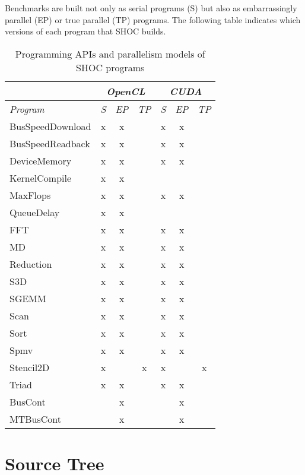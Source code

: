 \documentclass[11pt]{article}
\begin{document}
Benchmarks are built not only as serial programs (S) but also as 
embarrassingly parallel (EP) or true parallel (TP) programs. 
The following table indicates which versions of each program that 
SHOC builds.

\begin{table}
\centering
\begin{tabular}{|l|c|c|c|c|c|c|}
\hline
 & \multicolumn{3}{c|}{\em OpenCL} & \multicolumn{3}{c|}{\em CUDA} \\
\hline
{\em Program} & {\em S} & {\em EP} & {\em TP} & {\em S} & {\em EP} & {\em TP} \\
\hline\hline
BusSpeedDownload    & x & x &   & x & x &   \\
BusSpeedReadback    & x & x &   & x & x &   \\
DeviceMemory        & x & x &   & x & x &   \\
KernelCompile       & x & x &   &   &   &   \\
MaxFlops            & x & x &   & x & x &   \\
QueueDelay          & x & x &   &   &   &   \\
FFT                 & x & x &   & x & x &   \\
MD                  & x & x &   & x & x &   \\
Reduction           & x & x &   & x & x &   \\
S3D                 & x & x &   & x & x &   \\
SGEMM               & x & x &   & x & x &   \\
Scan                & x & x &   & x & x &   \\
Sort                & x & x &   & x & x &   \\
Spmv                & x & x &   & x & x &   \\
Stencil2D           & x &   & x & x &   & x \\
Triad               & x & x &   & x & x &   \\
BusCont             &   & x &   &   & x &   \\
MTBusCont           &   & x &   &   & x &   \\
\hline
\end{tabular}
\caption{Programming APIs and parallelism models of SHOC programs}
\end{table}

\section{Source Tree}\label{sec:source}
\end{document}
